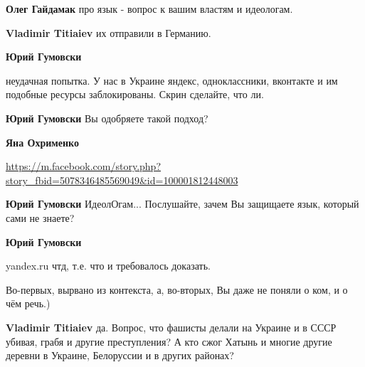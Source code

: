 \begin{itemize}
\begin{itemize}
\textbf{Олег Гайдамак} про язык - вопрос к вашим властям и идеологам.


\textbf{Vladimir Titiaiev} их отправили в Германию.


\textbf{Юрий Гумовски} 

неудачная попытка. У нас в Украине яндекс, одноклассники, вконтакте и им
подобные ресурсы заблокированы. Скрин сделайте, что ли.



\textbf{Юрий Гумовски} Вы одобряете такой подход?


\textbf{Яна Охрименко} 

\url{https://m.facebook.com/story.php?story_fbid=5078346485569049&id=100001812448003}


\textbf{Юрий Гумовски} ИдеолОгам... Послушайте, зачем Вы защищаете язык, который сами не знаете?


\textbf{Юрий Гумовски} 

yandex.ru чтд, т.е. что и требовалось доказать.

Во-первых, вырвано из контекста, а, во-вторых, Вы даже не поняли о ком, и о чём
речь.)


\textbf{Vladimir Titiaiev} да. Вопрос, что фашисты делали на Украине и в СССР убивая, грабя и другие преступления? А кто сжог Хатынь и многие другие деревни в Украине, Белоруссии и в других районах?




\end{itemize}
\end{itemize}
